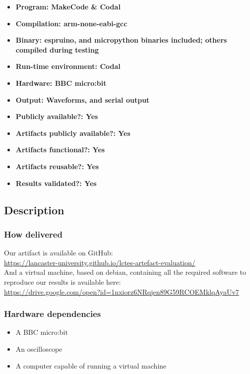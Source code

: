 {\small
\begin{itemize}
  \item {\bf Program: MakeCode \& Codal}
  \item {\bf Compilation: arm-none-eabi-gcc}
  \item {\bf Binary: espruino, and micropython binaries included; others compiled during testing}
  \item {\bf Run-time environment: Codal}
  \item {\bf Hardware: BBC micro:bit}
  \item {\bf Output: Waveforms, and serial output}
  \item {\bf Publicly available?: Yes}
\end{itemize}

\begin{itemize}
  \item {\bf Artifacts publicly available?: Yes}
  \item {\bf Artifacts functional?: Yes}
  \item {\bf Artifacts reusable?: Yes}
  \item {\bf Results validated?: Yes}
\end{itemize}

\subsection{Description}

\subsubsection{How delivered}

Our artifact is available on GitHub:\\[5pt]\url{https://lancaster-university.github.io/lctes-artefact-evaluation/}\\[5pt] And a virtual machine, based on debian, containing all the required software to reproduce our results is available here:\\[5pt]\url{https://drive.google.com/open?id=1nxiorz6NRqjen89G59RCOEMklqAyaUv7}

\subsubsection{Hardware dependencies}

\begin{itemize}
    \item A BBC micro:bit
    \item An oscilloscope
    \item A computer capable of running a virtual machine
\end{itemize}

}
